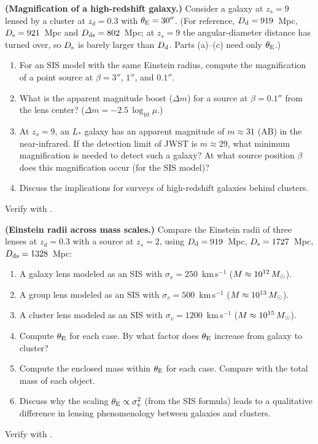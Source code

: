 \begin{exercise}
\label{ex:magnification_high_z}
\textbf{(Magnification of a high-redshift galaxy.)}
Consider a galaxy at $z_s = 9$ lensed by a cluster at $z_d = 0.3$
with $\theta_{\mathrm{E}} = 30''$.  (For reference, $D_{\mathrm{d}} = 919$~Mpc,
$D_{\mathrm{s}} = 921$~Mpc and $D_{\mathrm{ds}} = 802$~Mpc; at $z_s = 9$ the angular-diameter
distance has turned over, so $D_{\mathrm{s}}$ is barely larger than $D_{\mathrm{d}}$.  Parts
(a)--(c) need only $\theta_{\mathrm{E}}$.)
\begin{enumerate}[label=(\alph*)]
    \item For an SIS model with the same Einstein radius, compute the
          magnification of a point source at $\beta = 3''$, $1''$,
          and $0.1''$.
    \item What is the apparent magnitude boost ($\Delta m$) for a
          source at $\beta = 0.1''$ from the lens center?
          ($\Delta m = -2.5\,\log_{10}\mu$.)
    \item At $z_s = 9$, an $L_*$ galaxy has an apparent magnitude of
          $m \approx 31$ (AB) in the near-infrared.  If the detection
          limit of JWST is $m \approx 29$, what minimum magnification
          is needed to detect such a galaxy?  At what source position
          $\beta$ does this magnification occur (for the SIS model)?
    \item Discuss the implications for surveys of high-redshift
          galaxies behind clusters.
\end{enumerate}
Verify with
.
\end{exercise}

\begin{exercise}
\label{ex:einstein_radius_comparison}
\textbf{(Einstein radii across mass scales.)}
Compare the Einstein radii of three lenses at $z_d = 0.3$ with a
source at $z_s = 2$, using $D_{\mathrm{d}} = 919$~Mpc, $D_{\mathrm{s}} = 1727$~Mpc,
$D_{\mathrm{ds}} = 1328$~Mpc:
\begin{enumerate}[label=(\alph*)]
    \item A galaxy lens modeled as an SIS with $\sigma_v = 250$~km\,s$^{-1}$
          ($M \approx 10^{12}\,M_{\odot}$).
    \item A group lens modeled as an SIS with $\sigma_v = 500$~km\,s$^{-1}$
          ($M \approx 10^{13}\,M_{\odot}$).
    \item A cluster lens modeled as an SIS with $\sigma_v = 1200$~km\,s$^{-1}$
          ($M \approx 10^{15}\,M_{\odot}$).
    \item Compute $\theta_{\mathrm{E}}$ for each case.  By what factor does
          $\theta_{\mathrm{E}}$ increase from galaxy to cluster?
    \item Compute the enclosed mass within $\theta_{\mathrm{E}}$ for each case.
          Compare with the total mass of each object.
    \item Discuss why the scaling $\theta_{\mathrm{E}} \propto \sigma_v^2$
          (from the SIS formula) leads to a qualitative difference in
          lensing phenomenology between galaxies and clusters.
\end{enumerate}
Verify with
.
\end{exercise}


